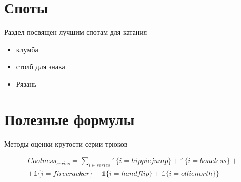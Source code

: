 \documentclass[12pt]{article} %
\begin{document}
\section{Споты}

Раздел посвящен лучшим спотам для катания

\begin{itemize}
\item клумба
\item столб для знака
\item Рязань
\end{itemize}

\section{Полезные формулы}

Методы оценки крутости серии трюков

\vspace*{2\baselineskip} %

\begin{equation}
\begin{split} %
Coolness_{series} = \sum\limits_{i\in series} \mathds{1}\{i = hippiejump\} + \mathds{1}\{i = boneless\} + \\
 + \mathds{1}\{i = firecracker\} + \mathds{1}\{i = handflip\} + \mathds{1}\{i = ollienorth\}  \}
\end{split}
\end{equation}
\end{document}
